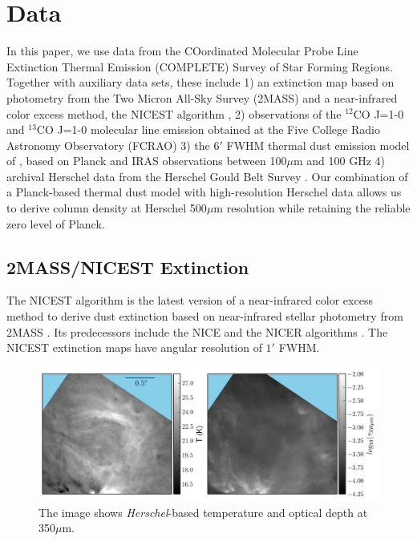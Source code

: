 \documentclass[11pt,a4paper]{emulateapj}
\begin{document}
\section{Data}
\label{sec:data}
In this paper, we use data from the COordinated Molecular Probe Line Extinction Thermal Emission (COMPLETE) Survey of Star Forming Regions. Together with auxiliary data sets, these include 1) an extinction map based on photometry from the Two Micron All-Sky Survey (2MASS) and a near-infrared color excess method, the NICEST algorithm \citep[][note that this is an improved version of the NICER algorithm and is developed after the COMPLETE Survey]{Lombardi_2009}, 2) observations of the $^{12}$CO J=1-0 and $^{13}$CO J=1-0 molecular line emission obtained at the Five College Radio Astronomy Observatory (FCRAO) 3) the 6$'$ FWHM thermal dust emission model of \cite{Meisner_2015}, based on Planck and IRAS observations between 100$\mu$m and 100 GHz 4) archival Herschel data from the Herschel Gould Belt Survey \citep{Andre_2010}. Our combination of a Planck-based thermal dust model with high-resolution Herschel data allows us to derive column density at Herschel 500$\mu$m resolution while retaining the reliable zero level of Planck.

\subsection{2MASS/NICEST Extinction}
The NICEST algorithm is the latest version of a near-infrared color excess method to derive dust extinction based on near-infrared stellar photometry from 2MASS \citep{Lombardi_2009}. Its predecessors include the NICE and the NICER algorithms \citep{Lombardi_2001,Lombardi_2005}. The NICEST extinction maps have angular resolution of $1'$ FWHM.

\begin{figure}[ht]
\centering
\includegraphics[scale=0.8]{fig/shell_herschel.png}
\caption{The image shows \textit{Herschel}-based temperature and optical depth at 350$\mu$m.
}
\end{figure}
\end{document}
